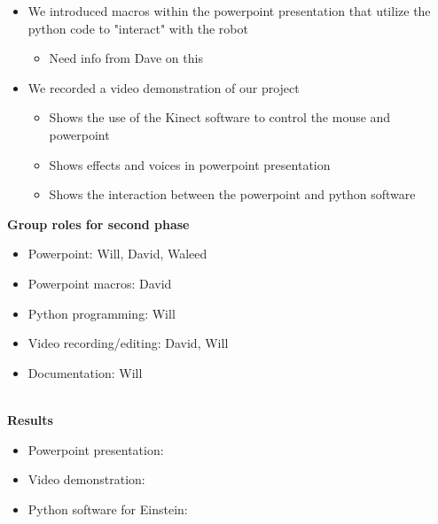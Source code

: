 \documentclass[12pt]{article}
\begin{document}
\begin{description}
\begin{itemize}
			\item We introduced macros within the powerpoint presentation that utilize the python code to "interact" with the robot
				\begin{itemize}
					\item Need info from Dave on this
				\end{itemize}
			\item We recorded a video demonstration of our project
				\begin{itemize}
					\item Shows the use of the Kinect software to control the mouse and powerpoint
					\item Shows effects and voices in powerpoint presentation
					\item Shows the interaction between the powerpoint and python software
				\end{itemize}
		\end{itemize}
		\textbf{Group roles for second phase}
		\begin{itemize}
			\item Powerpoint: Will, David, Waleed
			\item Powerpoint macros: David
			\item Python programming: Will
			\item Video recording/editing: David, Will
			\item Documentation: Will
		\end{itemize} \hfill \\
		\textbf{Results}
		\begin{itemize}
			\item Powerpoint presentation:
			\item Video demonstration:
			\item Python software for Einstein: 
		\end{itemize}
		
\end{description}
\end{document}
